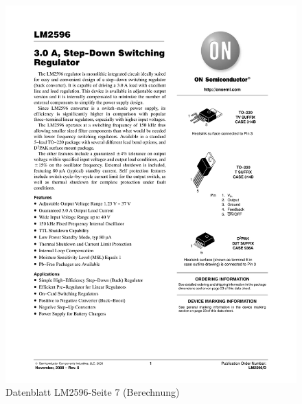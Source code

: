 \documentclass[12pt,a4paper]{article}
\begin{document}
\begin{figure}[H]
  \centering
		\includegraphics[scale=0.75, angle=0,page=7]{graphics/LM2596.PDF}
		\caption{Datenblatt LM2596-Seite 7 (Berechnung)}
		\label{datasheet:LM2596-2}
\end{figure}
\end{document}
